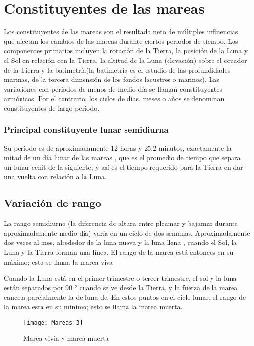 \documentclass[12pt]{article}
\begin{document}
\section*{Constituyentes de las mareas}

Los constituyentes de las mareas son el resultado neto de múltiples influencias que afectan los cambios de las mareas durante ciertos periodos de tiempo. Los componentes primarios incluyen la rotación de la Tierra, la posición de la Luna y el Sol en relación con la Tierra, la altitud de la Luna (elevación) sobre el ecuador de la Tierra y la batimetría(la batimetría es el estudio de las profundidades marinas, de la tercera dimensión de los fondos lacustres o marinos). Las variaciones con períodos de menos de medio día se llaman constituyentes armónicos. Por el contrario, los ciclos de días, meses o años se denominan constituyentes de largo período.




\subsubsection*{Principal constituyente lunar semidiurna}
Su período es de aproximadamente 12 horas y 25,2 minutos, exactamente la mitad de un día lunar de las mareas , que es el promedio de tiempo que separa un lunar cenit de la siguiente, y así es el tiempo requerido para la Tierra en dar una vuelta con relación a la Luna. 

\subsection*{Variación de rango}
La rango semidiurno (la diferencia de altura entre pleamar y bajamar durante aproximadamente medio día) varía en un ciclo de dos semanas. Aproximadamente dos veces al mes, alrededor de la luna nueva y la luna llena , cuando el Sol, la Luna y la Tierra forman una línea. El rango de la marea está entonces en su máximo; esto se llama la marea viva 



Cuando la Luna está en el primer trimestre o tercer trimestre, el sol y la luna están separados por 90 ° cuando se ve desde la Tierra, y la fuerza de la marea cancela parcialmente la de  luna de. En estos puntos en el ciclo lunar, el rango de la marea está en su mínimo; esto se llama la marea muerta.


\begin{figure}[ht]
\texttt{[image: Mareas-3]}
\centering
\caption{Marea vivia y marea muerta}
\end{figure}
\newpage
\end{document}
